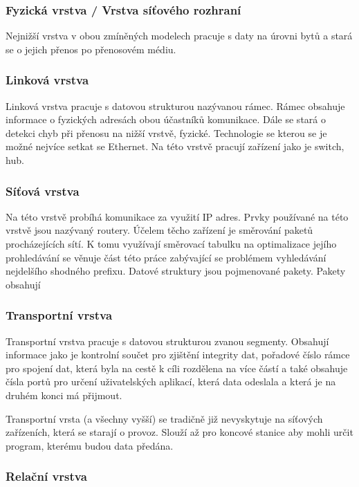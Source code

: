 \subsubsection{Fyzická vrstva / Vrstva síťového rozhraní}
Nejnižší vrstva v obou zmíněných modelech pracuje s daty na úrovni bytů a stará se o jejich přenos po přenosovém médiu.

\subsubsection{Linková vrstva}
Linková vrstva pracuje s datovou strukturou nazývanou rámec.
Rámec obsahuje informace o fyzických adresách obou účastníků komunikace.
Dále se stará o detekci chyb při přenosu na nižší vrstvě, fyzické.
Technologie se kterou se je možné nejvíce setkat se Ethernet.
Na této vrstvě pracují zařízení jako je switch, hub.

\subsubsection{Síťová vrstva}
Na této vrstvě probíhá komunikace za využití IP adres. Prvky používané na této vrstvě jsou nazývaný routery.
Účelem těcho zařízení je směrování paketů procházejících sítí. K tomu využívají směrovací tabulku na optimalizace jejího prohledávání
se věnuje část této práce zabývající se problémem vyhledávání nejdelšího shodného prefixu.
Datové struktury jsou pojmenované pakety.
Pakety obsahují

\subsubsection{Transportní vrstva}
Transportní vrstva pracuje s datovou strukturou zvanou segmenty. Obsahují informace jako je kontrolní součet pro zjištění integrity dat,
pořadové číslo rámce pro spojení dat, která byla na cestě k cíli rozdělena na více částí a také obsahuje čísla portů
pro určení uživatelských aplikací, která data odeslala a která je na druhém konci má přijmout.

Transportní vrsta (a všechny vyšší) se tradičně již nevyskytuje na síťových zařízeních, která se starají o provoz.
Slouží až pro koncové stanice aby mohli určit program, kterému budou data předána.

\subsubsection{Relační vrstva}


